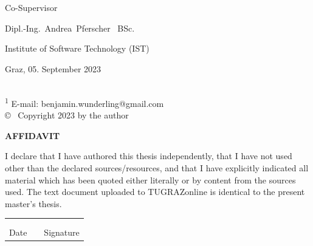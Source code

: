 \begin{titlepage}
\begin{center}
{\large Co-Supervisor}

{\large Dipl.-Ing.\ Andrea\ Pferscher \ BSc.}

{\large Institute of Software Technology (IST)}
\vspace{4mm}


\vfill
{Graz, 05. September 2023}
%
%
%
%
%
%
%
%
\end{center}

\noindent
\underline{\hspace*{3cm}}\\
{\footnotesize
\textsuperscript{1} E-mail: benjamin.wunderling@gmail.com\\
\copyright ~ Copyright 2023 by the author}

\end{titlepage}
\newpage
\vspace*{20mm}

\begin{center}
	{\Large\bfseries AFFIDAVIT}
\end{center}
\vspace{5mm}
\noindent
I declare that I have authored this thesis independently, that I have not used other than  the  declared  sources/resources,  and  that  I  have  explicitly  indicated  all  material which has been quoted either literally or by content from the sources used. The text document uploaded to TUGRAZonline is identical to the present master's thesis.

\vspace{2cm}

\noindent
\begin{tabular}{ccc}
	\hspace*{6cm}     & \hspace*{2cm}   & \hspace*{6.7cm}\\
	\dotfill          &                 & \dotfill\\
		   Date       &                 & Signature\\
\end{tabular}

